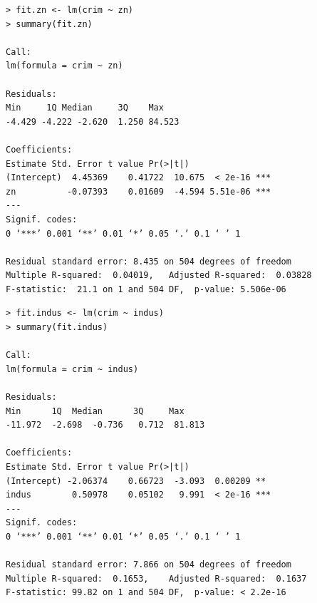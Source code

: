 \documentclass{article}
\begin{document}
\begin{itemize}
\begin{program}
\begin{verbatim}
> fit.zn <- lm(crim ~ zn)
> summary(fit.zn)

Call:
lm(formula = crim ~ zn)

Residuals:
Min     1Q Median     3Q    Max 
-4.429 -4.222 -2.620  1.250 84.523 

Coefficients:
Estimate Std. Error t value Pr(>|t|)    
(Intercept)  4.45369    0.41722  10.675  < 2e-16 ***
zn          -0.07393    0.01609  -4.594 5.51e-06 ***
---
Signif. codes:  
0 ‘***’ 0.001 ‘**’ 0.01 ‘*’ 0.05 ‘.’ 0.1 ‘ ’ 1

Residual standard error: 8.435 on 504 degrees of freedom
Multiple R-squared:  0.04019,	Adjusted R-squared:  0.03828 
F-statistic:  21.1 on 1 and 504 DF,  p-value: 5.506e-06
\end{verbatim}
\end{program}

\begin{program}
\begin{verbatim}
> fit.indus <- lm(crim ~ indus)
> summary(fit.indus)

Call:
lm(formula = crim ~ indus)

Residuals:
Min      1Q  Median      3Q     Max 
-11.972  -2.698  -0.736   0.712  81.813 

Coefficients:
Estimate Std. Error t value Pr(>|t|)    
(Intercept) -2.06374    0.66723  -3.093  0.00209 ** 
indus        0.50978    0.05102   9.991  < 2e-16 ***
---
Signif. codes:  
0 ‘***’ 0.001 ‘**’ 0.01 ‘*’ 0.05 ‘.’ 0.1 ‘ ’ 1

Residual standard error: 7.866 on 504 degrees of freedom
Multiple R-squared:  0.1653,	Adjusted R-squared:  0.1637 
F-statistic: 99.82 on 1 and 504 DF,  p-value: < 2.2e-16
\end{verbatim}
\end{program}



\end{itemize}
\end{document}
